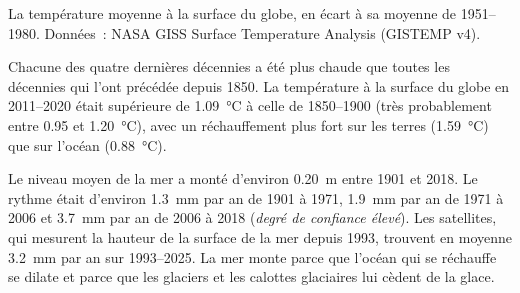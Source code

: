 \begin{omfigure}

{\small La température moyenne à la surface du globe, en écart à sa moyenne
de 1951--1980. Données~: NASA GISS Surface Temperature Analysis
(GISTEMP v4).}
\end{omfigure}

\begin{proposition}\label{prop:g12:climate-change:warming}
Chacune des quatre dernières décennies a été plus chaude que toutes les
décennies qui l'ont précédée depuis 1850. La température à la surface du
globe en 2011--2020 était supérieure de \qty{1.09}{\degreeCelsius} à celle
de 1850--1900 (très probablement entre 0.95 et
\qty{1.20}{\degreeCelsius}), avec un réchauffement plus fort sur les terres
(\qty{1.59}{\degreeCelsius}) que sur l'océan (\qty{0.88}{\degreeCelsius}).
\end{proposition}

\begin{proposition}\label{prop:g12:climate-change:sea}
Le niveau moyen de la mer a monté d'environ \qty{0.20}{m} entre 1901 et
2018. Le rythme était d'environ \qty{1.3}{mm} par an de 1901 à 1971,
\qty{1.9}{mm} par an de 1971 à 2006 et \qty{3.7}{mm} par an de 2006 à 2018
(\emph{degré de confiance élevé}). Les satellites, qui mesurent la hauteur
de la surface de la mer depuis 1993, trouvent en moyenne \qty{3.2}{mm} par
an sur 1993--2025. La mer monte parce que l'océan qui se réchauffe se
dilate et parce que les glaciers et les calottes glaciaires lui cèdent de
la glace.
\end{proposition}

